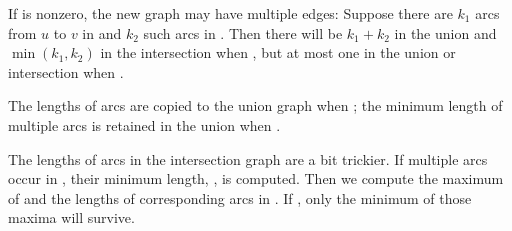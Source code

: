 If  is nonzero, the new graph may have multiple edges: Suppose
there are $k_1$ arcs from $u$ to $v$ in  and $k_2$ such arcs in . Then
there will be $k_1+k_2$ in the union and $\min(k_1,k_2)$ in the
intersection when , but at most
one in the union or intersection when .

The lengths of arcs are copied to the union graph when ;
the minimum length of multiple arcs is retained in the union when .

The lengths of arcs in the intersection graph are a bit trickier.
If multiple arcs occur in , their minimum length, , is
computed. Then
we compute the maximum of  and the lengths of corresponding arcs
in . If , only the minimum of those maxima
will survive.

\fi


